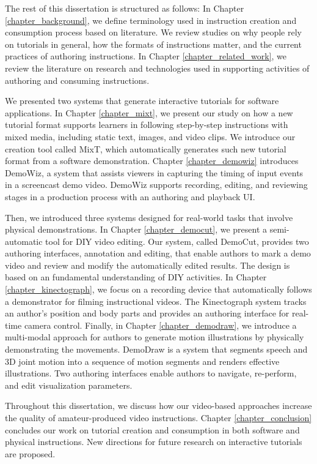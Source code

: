 The rest of this dissertation is structured as follows:
%
In Chapter \ref{chapter_background}, we define terminology used in instruction creation and consumption process based on literature. We review studies on why people rely on tutorials in general, how the formats of instructions matter, and the current practices of authoring instructions.
%
In Chapter \ref{chapter_related_work}, we review the literature on research and technologies used in supporting activities of authoring and consuming instructions.

We presented two systems that generate interactive tutorials for software applications.
In Chapter \ref{chapter_mixt}, we present our study on how a new tutorial format supports learners in following step-by-step instructions with mixed media, including static text, images, and video clips. We introduce our creation tool called MixT, which automatically generates such new tutorial format from a software demonstration.
Chapter \ref{chapter_demowiz} introduces DemoWiz, a system that assists viewers in capturing the timing of input events in a screencast demo video. DemoWiz supports recording, editing, and reviewing stages in a production process with an authoring and playback UI.

Then, we introduced three systems designed for real-world tasks that involve physical demonstrations.
In Chapter \ref{chapter_democut}, we present a semi-automatic tool for DIY video editing. Our system, called DemoCut, provides two authoring interfaces, annotation and editing, that enable authors to mark a demo video and review and modify the automatically edited results. The design is based on an fundamental understanding of DIY activities.
In Chapter \ref{chapter_kinectograph}, we focus on a recording device that automatically follows a demonstrator for filming instructional videos. The Kinectograph system tracks an author's position and body parts and provides an authoring interface for real-time camera control.
Finally, in Chapter \ref{chapter_demodraw}, we introduce a multi-modal approach for authors to generate motion illustrations by physically demonstrating the movements. DemoDraw is a system that segments speech and 3D joint motion into a sequence of motion segments and renders effective illustrations. Two authoring interfaces enable authors to navigate, re-perform, and edit visualization parameters.

Throughout this dissertation, we discuss how our video-based approaches increase the quality of amateur-produced video instructions. Chapter \ref{chapter_conclusion} concludes our work on tutorial creation and consumption in both software and physical instructions. New directions for future research on interactive tutorials are proposed.

